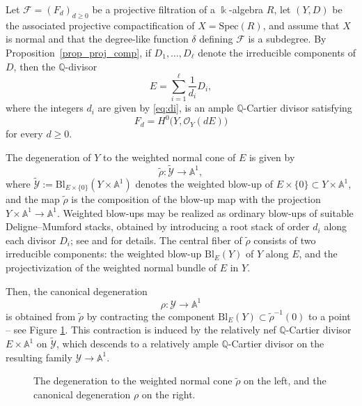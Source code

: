 \documentclass[12pt,letterpaper, reqno]{amsart}
\theoremstyle{defstyle} \newtheorem{definition}[theorem]{Definition}
\theoremstyle{remark}
\numberwithin{equation}{section}
\numberwithin{figure}{section}
\newcommand{\Spec} {\mathrm{Spec}}
\newcommand{\kk} {\Bbbk}
\newcommand{\A} {\mathbb{A}}
\newcommand{\QQ} {\mathbb{Q}}
\newcommand{\cY} {\mathcal{Y}}
\begin{document}
Let \(\mathcal F=(F_d)_{d\ge0}\) be a projective filtration of a \(\kk\)-algebra \(R\), let \((Y,D)\) be the associated projective compactification of \(X=\Spec(R)\), and assume that \(X\) is normal and that the degree-like function \(\delta\) defining \(\mathcal F\) is a subdegree. By Proposition~\ref{prop_proj_comp}, if \(D_1,\ldots,D_\ell\) denote the irreducible components of \(D\), then the \(\QQ\)-divisor
\[
E=\sum_{i=1}^{\ell}\frac{1}{d_i}D_i,
\]
where the integers \(d_i\) are given by \eqref{eq:di}, is an ample \(\QQ\)-Cartier divisor satisfying
\[
F_d=H^0\bigl(Y,\mathcal O_Y(dE)\bigr)
\]
for every \(d\ge0\).

The degeneration of \(Y\) to the weighted normal cone of \(E\) is given by
\[
\widetilde{\rho}\colon
\widetilde{\cY}
\longrightarrow
\A^1,
\]
where $\widetilde{\cY}:=\mathrm{Bl}_{E\times\{0\}}(Y\times\A^1)$ denotes the weighted blow-up of \(E\times\{0\}\subset Y\times\A^1\), and the map $\widetilde{\rho}$ is the composition of the blow-up map with the projection $Y \times \A^1 \rightarrow \A^1$. 
Weighted blow-ups may be realized as ordinary blow-ups of suitable Deligne--Mumford stacks, obtained by introducing a root stack of order \(d_i\) along each divisor \(D_i\); see \cite{quek2021weighted} and \cite[\S~3]{abramovich2024functorial} for details. The central fiber of \(\widetilde{\rho}\) consists of two irreducible components: the weighted blow-up \(\mathrm{Bl}_E(Y)\) of \(Y\) along \(E\), and the projectivization of the weighted normal bundle of \(E\) in \(Y\).

Then, the canonical degeneration
\[
\rho\colon \mathcal Y\longrightarrow\A^1
\]
is obtained from \(\widetilde{\rho}\) by contracting the component
\(\mathrm{Bl}_E(Y)\subset\widetilde{\rho}^{-1}(0)\) to a point -- see Figure \ref{figure2}. 
This contraction is induced by the relatively nef \(\QQ\)-Cartier divisor \(E\times\A^1\) on $\widetilde{\cY}$, which descends to a relatively ample \(\QQ\)-Cartier divisor on the resulting family
\(\mathcal Y\to\A^1\).


\begin{figure}[htbp]
\center{\scalebox{.6}{}}
\caption{The degeneration to the weighted normal cone $\widetilde{\rho}$ on the left, and the canonical degeneration $\rho$ on the right.}
\label{figure2}
\end{figure}
\end{document}
